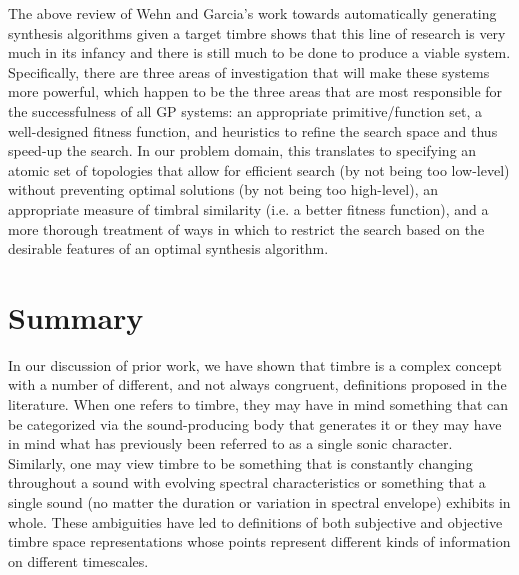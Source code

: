 \documentclass[12pt]{report} 	%
\numberwithin{figure}{chapter}
\numberwithin{table}{chapter}
\numberwithin{equation}{chapter}
\begin{document}
\begin{flushleft}
The above review of Wehn and Garcia's work towards automatically generating synthesis algorithms given a target timbre shows that this line of research is very much in its infancy and there is still much to be done to produce a viable system. Specifically, there are three areas of investigation that will make these systems more powerful, which happen to be the three areas that are most responsible for the successfulness of all GP systems: an appropriate primitive/function set, a well-designed fitness function, and heuristics to refine the search space and thus speed-up the search. In our problem domain, this translates to specifying an atomic set of topologies that allow for efficient search (by not being too low-level) without preventing optimal solutions (by not being too high-level), an appropriate measure of timbral similarity (i.e. a better fitness function), and a more thorough treatment of ways in which to restrict the search based on the desirable features of an optimal synthesis algorithm.

\section{Summary}
In our discussion of prior work, we have shown that timbre is a complex concept with a number of different, and not always congruent, definitions proposed in the literature. When one refers to timbre, they may have in mind something that can be categorized via the sound-producing body that generates it or they may have in mind what has previously been referred to as a single sonic character. Similarly, one may view timbre to be something that is constantly changing throughout a sound with evolving spectral characteristics or something that a single sound (no matter the duration or variation in spectral envelope) exhibits in whole. These ambiguities have led to definitions of both subjective and objective timbre space representations whose points represent different kinds of information on different timescales.


\end{flushleft}
\end{document}
